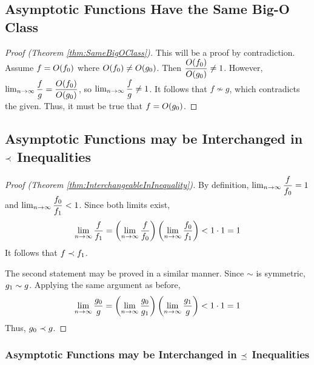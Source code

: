 \subsection{Asymptotic Functions Have the Same Big-O Class}

\begin{proof}[Proof (Theorem \ref{thm:SameBigOClass})]
	This will be a proof by contradiction. Assume $f = O(f_0)$ where $O(f_0) \neq O(g_0)$. Then $\dfrac {O(f_0)} {O(g_0)} \neq 1$. However, $\lim_{n \to \infty} \dfrac{f}{g} = \dfrac {O(f_0)} {O(g_0)}$, so $\lim_{n \to \infty} \dfrac{f}{g} \neq 1$. It follows that $f \not\sim g$, which contradicts the given. Thus, it must be true that $f = O(g_0)$.
\end{proof}

\subsection{Asymptotic Functions may be Interchanged in $\prec$ Inequalities}

\begin{proof}[Proof (Theorem \ref{thm:InterchangeableInInequality})]
	By definition, $\lim_{n \to \infty} \dfrac{f}{f_0} = 1$ and $\lim_{n \to \infty} \dfrac{f_0}{f_1} < 1$. Since both limits exist,
	\begin{align*}
	\lim_{n \to \infty} \frac{f}{f_1} = \left( \lim_{n \to \infty} \frac{f}{f_0} \right) \left( \lim_{n \to \infty} \frac{f_0}{f_1} \right) < 1 \cdot 1 = 1
	\end{align*}
	It follows that $f \prec f_1$.
	
	The second statement may be proved in a similar manner. Since $\sim$ is symmetric, $g_1 \sim g$. Applying the same argument as before,
	\begin{align*}
	\lim_{n \to \infty} \frac{g_0}{g} = \left( \lim_{n \to \infty} \frac{g_0}{g_1} \right) \left( \lim_{n \to \infty} \frac{g_1}{g} \right) < 1 \cdot 1 = 1
	\end{align*}
	Thus, $g_0 \prec g$.
\end{proof}

\subsubsection{Asymptotic Functions may be Interchanged in $\preceq$ Inequalities}

